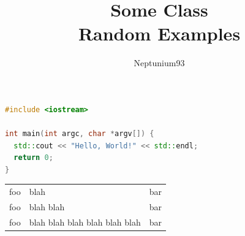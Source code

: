 \documentclass{report}
\title{\Huge{Some Class}\\Random Examples}
\author{\Huge{Neptunium93}}
\date{}
\begin{document}
\maketitle
\newpage %
\newpage
{}
\tableofcontents
\pagebreak

\begin{lstlisting}[language=C++, caption={Write to stdout},label={lst:stream-out}]
#include <iostream>

int main(int argc, char *argv[]) {
  std::cout << "Hello, World!" << std::endl;
  return 0;
}
\end{lstlisting}
% 

\begin{tabular}{l V{3.5cm} r}
  foo &  \textcolor[HTML]{DDDDDD}{blah}      & bar \\
  foo & blah blah & bar \\
  foo & blah blah blah blah blah blah
      &  bar \\
\end{tabular}


\end{document}
